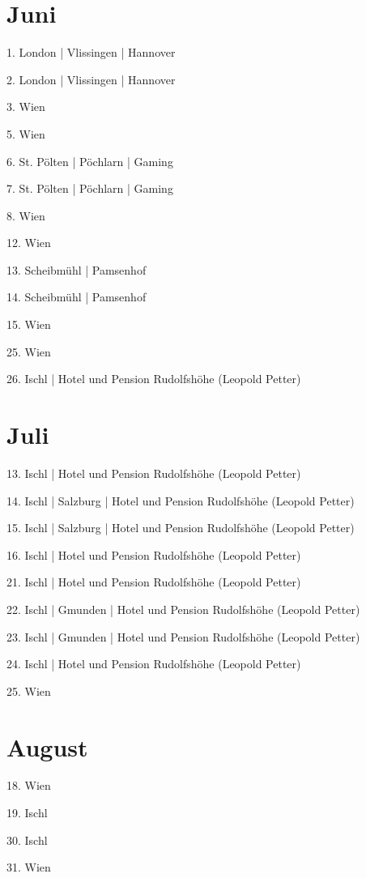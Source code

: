 \documentclass[twoside=false,titlepage=false,open=any, parskip=never, fontsize=10pt, headings=small, chapterprefix=false, appendixprefix=false, DIV=15]{scrbook}
\begin{document}
\begin{multicols}{3}
            \section*{Juni}
            1. London | Vlissingen | Hannover\par
            2. London | Vlissingen | Hannover\par
            3. Wien\par
            5. Wien\par
            6. St. Pölten | Pöchlarn | Gaming\par
            7. St. Pölten | Pöchlarn | Gaming\par
            8. Wien\par
            12. Wien\par
            13. Scheibmühl | Pamsenhof\par
            14. Scheibmühl | Pamsenhof\par
            15. Wien\par
            25. Wien\par
            26. Ischl | Hotel und Pension Rudolfshöhe (Leopold Petter)\par
            \section*{Juli}
            13. Ischl | Hotel und Pension Rudolfshöhe (Leopold Petter)\par
            14. Ischl | Salzburg | Hotel und Pension Rudolfshöhe (Leopold Petter)\par
            15. Ischl | Salzburg | Hotel und Pension Rudolfshöhe (Leopold Petter)\par
            16. Ischl | Hotel und Pension Rudolfshöhe (Leopold Petter)\par
            21. Ischl | Hotel und Pension Rudolfshöhe (Leopold Petter)\par
            22. Ischl | Gmunden | Hotel und Pension Rudolfshöhe (Leopold Petter)\par
            23. Ischl | Gmunden | Hotel und Pension Rudolfshöhe (Leopold Petter)\par
            24. Ischl | Hotel und Pension Rudolfshöhe (Leopold Petter)\par
            25. Wien\par
            \section*{August}
            18. Wien\par
            19. Ischl\par
            30. Ischl\par
            31. Wien\par

\end{multicols}
\end{document}
